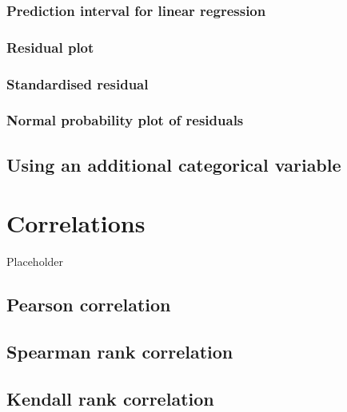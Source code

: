 \documentclass[english,10pt,a4paper,oneside]{book}
\begin{document}
\hypertarget{prediction-interval-for-linear-regression}{%
\subsection{Prediction interval for linear regression}\label{prediction-interval-for-linear-regression}}

\hypertarget{residual-plot}{%
\subsection{Residual plot}\label{residual-plot}}

\hypertarget{standardised-residual}{%
\subsection{Standardised residual}\label{standardised-residual}}

\hypertarget{normal-probability-plot-of-residuals}{%
\subsection{Normal probability plot of residuals}\label{normal-probability-plot-of-residuals}}

\hypertarget{using-an-additional-categorical-variable}{%
\section{Using an additional categorical variable}\label{using-an-additional-categorical-variable}}

\hypertarget{correlations}{%
\chapter{Correlations}\label{correlations}}

Placeholder

\hypertarget{pearson-correlation}{%
\section{Pearson correlation}\label{pearson-correlation}}

\hypertarget{spearman-rank-correlation}{%
\section{Spearman rank correlation}\label{spearman-rank-correlation}}

\hypertarget{kendall-rank-correlation}{%
\section{Kendall rank correlation}\label{kendall-rank-correlation}}
\end{document}
